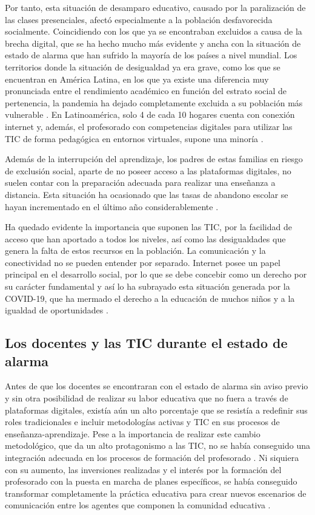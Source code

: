 \documentclass[spanish]{textolivre}
\begin{document}
Por tanto, esta situación de desamparo educativo, causado por la paralización de las clases presenciales, afectó especialmente a la población desfavorecida socialmente. Coincidiendo con los que ya se encontraban excluidos a causa de la brecha digital, que se ha hecho mucho más evidente y ancha con la situación de estado de alarma que han sufrido la mayoría de los países a nivel mundial. Los territorios donde la situación de desigualdad ya era grave, como los que se encuentran en América Latina, en los que ya existe una diferencia muy pronunciada entre el rendimiento académico en función del estrato social de pertenencia, la pandemia ha dejado completamente excluida a su población más vulnerable \cite{alvarez-gardyn2020, barbozacid2020}. En Latinoamérica, solo 4 de cada 10 hogares cuenta con conexión internet y, además, el profesorado con competencias digitales para utilizar las TIC de forma pedagógica en entornos virtuales, supone una minoría \cite{murillo2020}.

Además de la interrupción del aprendizaje, los padres de estas familias en riesgo de exclusión social, aparte de no poseer acceso a las plataformas digitales, no suelen contar con la preparación adecuada para realizar una enseñanza a distancia. Esta situación ha ocasionado que las tasas de abandono escolar se hayan incrementado en el último año considerablemente \cite{murillo2020}.

Ha quedado evidente la importancia que suponen las TIC, por la facilidad de acceso que han aportado a todos los niveles, así como las desigualdades que genera la falta de estos recursos en la población. La comunicación y la conectividad no se pueden entender por separado. Internet posee un papel principal en el desarrollo social, por lo que se debe concebir como un derecho por su carácter fundamental y así lo ha subrayado esta situación generada por la COVID-19, que ha mermado el derecho a la educación de muchos niños y a la igualdad de oportunidades \cite{martinezlopez2020}.

\subsection{Los docentes y las TIC durante el estado de alarma}
Antes de que los docentes se encontraran con el estado de alarma sin aviso previo y sin otra posibilidad de realizar su labor educativa que no fuera a través de plataformas digitales, existía aún un alto porcentaje que se resistía a redefinir sus roles tradicionales e incluir metodologías activas y TIC en sus procesos de enseñanza-aprendizaje. Pese a la importancia de realizar este cambio metodológico, que da un alto protagonismo a las TIC, no se había conseguido una integración adecuada en los procesos de formación del profesorado \cite{rodriguezgarcia2018}. Ni siquiera con su aumento, las inversiones realizadas y el interés por la formación del profesorado con la puesta en marcha de planes específicos, se había conseguido transformar completamente la práctica educativa para crear nuevos escenarios de comunicación entre los agentes que componen la comunidad educativa \cite{caberoalmenara2017}.
\end{document}
